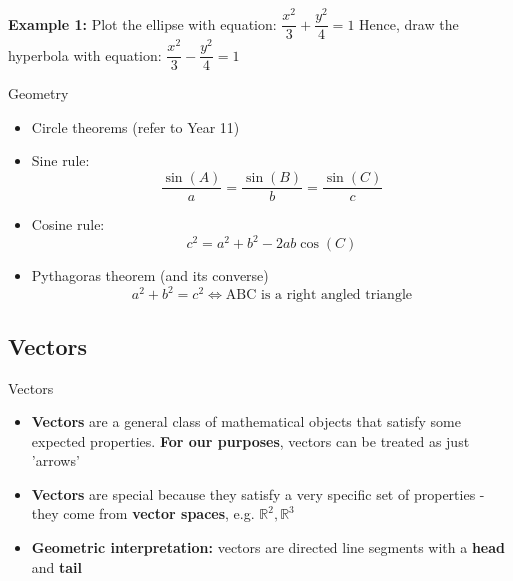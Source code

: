 \documentclass{beamer}
\begin{document}
\begin{frame}
	\textbf{Example 1:} Plot the ellipse with equation:
	$\dfrac{x^2}{3} + \dfrac{y^2}{4} = 1$
	Hence, draw the hyperbola with equation:
	$\dfrac{x^2}{3} - \dfrac{y^2}{4} = 1$
	\vspace{5cm}
\end{frame}

\begin{frame}{Geometry}
	\begin{itemize}
		\item Circle theorems (refer to Year 11)
		\item Sine rule:
			$$\dfrac{\sin(A)}{a} = \dfrac{\sin(B)}{b} = \dfrac{\sin(C)}{c}$$
		\item Cosine rule:
			$$c^2 = a^2 + b^2 - 2ab\cos(C)$$
		\item Pythagoras theorem (and its converse)
			$$a^2 + b^2 = c^2 \Leftrightarrow \text{ABC is a right angled triangle}$$
	\end{itemize}
\end{frame}

\subsection{Vectors}
\begin{frame}{Vectors}
\begin{itemize}
	\item \textbf{Vectors} are a general class of mathematical objects that satisfy some expected properties. \textbf{For our purposes}, vectors can be treated as just 'arrows'
	\item \textbf{Vectors} are special because they satisfy a very specific set of properties - they come from \textbf{vector spaces}, e.g. $\mathbb{R}^2, \mathbb{R}^3$
	\item \textbf{Geometric interpretation:} vectors are directed line segments with a \textbf{head} and \textbf{tail}
\end{itemize}
\end{frame}
\end{document}
